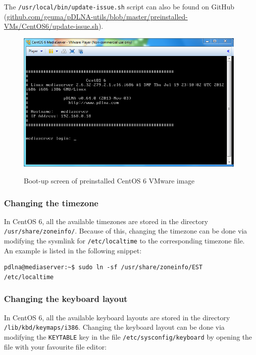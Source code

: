 \documentclass[a4paper,oneside,10pt]{report}
\begin{document}
The \verb|/usr/local/bin/update-issue.sh| script can also be found on GitHub (\url{github.com/geuma/pDLNA-utils/blob/master/preinstalled-VMs/CentOS6/update-issue.sh}).

\begin{figure}
	\centering
		\includegraphics[width=34em]{images/vm_centos6_loginscreen}
	\label{fig:centos6-loginscreen}
	\caption{Boot-up screen of preinstalled CentOS 6 VMware image}
\end{figure}

\subsubsection{Changing the timezone}

In CentOS 6, all the available timezones are stored in the directory \verb|/usr/share/zoneinfo/|. Because of this, changing the timezone can be done via modifying the sysmlink for \verb|/etc/localtime| to the corresponding timezone file. An example is listed in the following snippet:

\begin{lstlisting}
pdlna@mediaserver:~$ sudo ln -sf /usr/share/zoneinfo/EST /etc/localtime
\end{lstlisting}

\subsubsection{Changing the keyboard layout}

In CentOS 6, all the available keyboard layouts are stored in the directory \verb|/lib/kbd/keymaps/i386|. Changing the keyboard layout can be done via modifying the \verb|KEYTABLE| key in the file \verb|/etc/sysconfig/keyboard| by opening the file with your favourite file editor:
\end{document}
